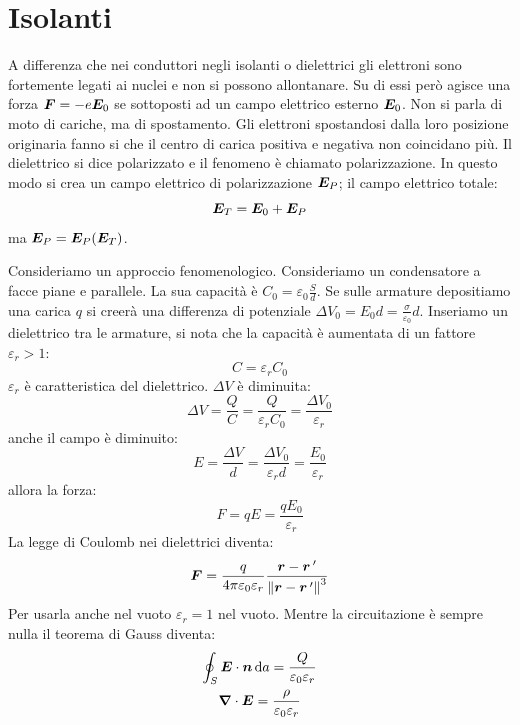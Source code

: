 \section{Isolanti}
A differenza che nei conduttori negli isolanti o dielettrici gli elettroni sono fortemente legati ai nuclei e non si possono allontanare. Su di essi però agisce una forza $\boldsymbol{F}=-e\boldsymbol{E}_0$ se sottoposti ad un campo elettrico esterno $\boldsymbol{E}_0$. Non si parla di moto di cariche, ma di spostamento. Gli elettroni spostandosi dalla loro posizione originaria fanno si che il centro di carica positiva e negativa non coincidano più. Il dielettrico si dice polarizzato e il fenomeno è chiamato polarizzazione. In questo modo si crea un campo elettrico di polarizzazione $\boldsymbol{E}_P$; il campo elettrico totale:
\begin{equation}
  \boldsymbol{E}_T=\boldsymbol{E}_0+\boldsymbol{E}_P
\end{equation}
ma $\boldsymbol{E}_P=\boldsymbol{E}_P(\boldsymbol{E}_T)$.

Consideriamo un approccio fenomenologico. Consideriamo un condensatore a facce piane e parallele. La sua capacità è $C_0=\varepsilon_0\frac{S}{d}$. Se sulle armature depositiamo una carica $q$ si creerà una differenza di potenziale $\Delta V_0=E_0d=\frac{\sigma}{\varepsilon_0}d$. Inseriamo un dielettrico tra le armature, si nota che la capacità è aumentata di un fattore $\varepsilon_r>1$:
\[C=\varepsilon_rC_0\]
$\varepsilon_r$ è caratteristica del dielettrico. $\Delta V$ è diminuita:
\[\Delta V=\frac{Q}{C}=\frac{Q}{\varepsilon_r C_0}=\frac{\Delta V_0}{\varepsilon_r}\]
anche il campo è diminuito:
\[E=\frac{\Delta V}{d}=\frac{\Delta V_0}{\varepsilon_rd}=\frac{E_0}{\varepsilon_r}\]
allora la forza:
\[F=qE=\frac{qE_0}{\varepsilon_r}\]
La legge di Coulomb nei dielettrici diventa:
\begin{equation}
  \boldsymbol{F}=\frac{q}{4\pi\varepsilon_0\varepsilon_r}\frac{\boldsymbol{r}-\boldsymbol{r}\,'}{{\left\lVert\boldsymbol{r}-\boldsymbol{r}\,'\right\rVert}^3}
\end{equation}
Per usarla anche nel vuoto $\varepsilon_r=1$ nel vuoto. Mentre la circuitazione è sempre nulla il teorema di Gauss diventa:
\begin{subequations}
  \begin{gather}
    \oint_S\boldsymbol{E}\cdot\boldsymbol{n}\,\mathrm{d} a=\frac{Q}{\varepsilon_0\varepsilon_r}\\
    \boldsymbol{\nabla}\cdot\boldsymbol{E}=\frac{\rho}{\varepsilon_0\varepsilon_r}
  \end{gather}
\end{subequations}
